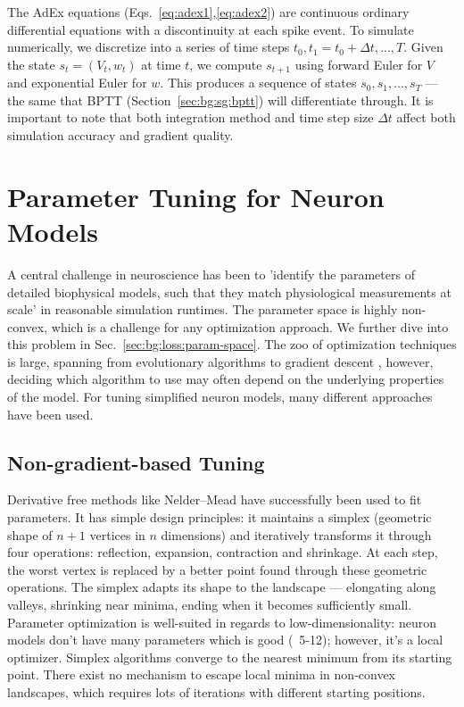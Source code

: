 The \gls{AdEx} equations (Eqs.~\ref{eq:adex1},\ref{eq:adex2}) are continuous ordinary differential equations with a discontinuity at each spike event.
To simulate numerically, we discretize into a series of time steps $t_0, t_1 = t_0 + \Delta t, ..., T$.
Given the state $s_t = (V_t, w_t)$ at time $t$, we compute $s_{t+1}$ using forward Euler for $V$ and exponential Euler for $w$.
This produces a sequence of states $s_0, s_1, ..., s_T$ — the same that \gls{BPTT} (Section~\ref{sec:bg:sg:bptt}) will differentiate through.
It is important to note that both integration method and time step size $\Delta t$ affect both simulation accuracy and gradient quality.

\section{Parameter Tuning for Neuron Models}\label{sec:bg:parameter-tuning}
A central challenge in neuroscience has been to 'identify the parameters of detailed biophysical models, such that they match physiological measurements at scale' \cite{Deistler2025} in reasonable simulation runtimes.
The parameter space is highly non-convex, which is a challenge for any optimization approach.
We further dive into this problem in Sec.~\ref{sec:bg:loss:param-space}.
The zoo of optimization techniques is large, spanning from evolutionary algorithms \cite{VanGeit2008} to gradient descent \cite{Jones2024}, however, deciding which algorithm to use may often depend on the underlying properties of the model.
For tuning simplified neuron models, many different approaches have been used.

\subsection{Non-gradient-based Tuning}\label{sec:bg:tuning:non-gradient-based}
Derivative free methods like Nelder--Mead have successfully been used to fit parameters.
It has simple design principles: it maintains a simplex (geometric shape of $n+1$ vertices in $n$ dimensions) and iteratively transforms it through four operations:
reflection, expansion, contraction and shrinkage.
At each step, the worst vertex is replaced by a better point found through these geometric operations.
The simplex adapts its shape to the landscape --- elongating along valleys, shrinking near minima, ending when it becomes sufficiently small.
Parameter optimization is well-suited in regards to low-dimensionality: neuron models don't have many parameters which is good (~5-12);
however, it's a local optimizer.
Simplex algorithms converge to the nearest minimum from its starting point.
There exist no mechanism to escape local minima in non-convex landscapes, which requires lots of iterations with different starting positions.

